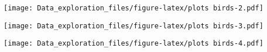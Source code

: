 \documentclass[]{article}
\newenvironment{Shaded}{\begin{snugshade}}{\end{snugshade}}
\newcommand{\KeywordTok}[1]{\textcolor[rgb]{0.13,0.29,0.53}{\textbf{#1}}}
\newcommand{\DecValTok}[1]{\textcolor[rgb]{0.00,0.00,0.81}{#1}}
\newcommand{\StringTok}[1]{\textcolor[rgb]{0.31,0.60,0.02}{#1}}
\newcommand{\CommentTok}[1]{\textcolor[rgb]{0.56,0.35,0.01}{\textit{#1}}}
\newcommand{\OperatorTok}[1]{\textcolor[rgb]{0.81,0.36,0.00}{\textbf{#1}}}
\newcommand{\NormalTok}[1]{#1}
\begin{document}
\texttt{[image: Data\_exploration\_files/figure-latex/plots birds-2.pdf]}

\begin{Shaded}
\end{Shaded}

\texttt{[image: Data\_exploration\_files/figure-latex/plots birds-3.pdf]}

\begin{Shaded}
\end{Shaded}

\texttt{[image: Data\_exploration\_files/figure-latex/plots birds-4.pdf]}

\begin{Shaded}
\end{Shaded}
\end{document}
